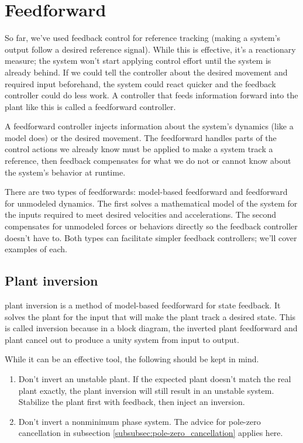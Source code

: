 \section{Feedforward}

So far, we've used feedback control for \gls{reference} \gls{tracking} (making a
\gls{system}'s output follow a desired \gls{reference} signal). While this is
effective, it's a reactionary measure; the \gls{system} won't start applying
\gls{control effort} until the \gls{system} is already behind. If we could tell
the \gls{controller} about the desired movement and required input beforehand,
the \gls{system} could react quicker and the feedback \gls{controller} could do
less work. A \gls{controller} that feeds information forward into the
\gls{plant} like this is called a \gls{feedforward controller}.

A \gls{feedforward controller} injects information about the \gls{system}'s
dynamics (like a \gls{model} does) or the desired movement. The feedforward
handles parts of the control actions we already know must be applied to make a
\gls{system} track a \gls{reference}, then feedback compensates for what we do
not or cannot know about the \gls{system}'s behavior at runtime.

There are two types of feedforwards: model-based feedforward and feedforward for
unmodeled dynamics. The first solves a mathematical model of the system for the
inputs required to meet desired velocities and accelerations. The second
compensates for unmodeled forces or behaviors directly so the feedback
controller doesn't have to. Both types can facilitate simpler feedback
controllers; we'll cover examples of each.

\subsection{Plant inversion}
\label{subsec:plant_inversion}

\Gls{plant} inversion is a method of model-based feedforward for \gls{state}
feedback. It solves the \gls{plant} for the input that will make the \gls{plant}
track a desired state. This is called inversion because in a block diagram, the
inverted \gls{plant} feedforward and \gls{plant} cancel out to produce a unity
system from input to output.

While it can be an effective tool, the following should be kept in mind.
\begin{enumerate}
  \item Don't invert an unstable \gls{plant}. If the expected \gls{plant}
    doesn't match the real \gls{plant} exactly, the \gls{plant} inversion will
    still result in an unstable \gls{system}. Stabilize the \gls{plant} first
    with feedback, then inject an inversion.
  \item Don't invert a nonminimum phase system. The advice for pole-zero
    cancellation in subsection \ref{subsubsec:pole-zero_cancellation} applies
    here.
\end{enumerate}


